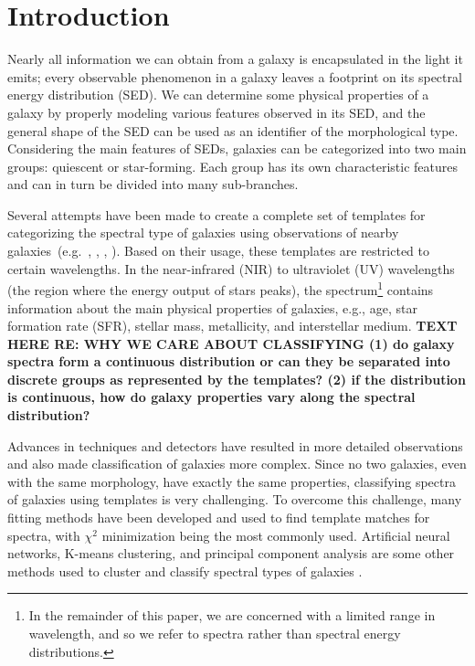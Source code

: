 \section{Introduction}
\label{sec: intro_somz}
Nearly all information we can obtain from a galaxy is encapsulated in the light it emits; every observable phenomenon in a galaxy leaves a footprint on its spectral energy distribution (SED).
We can determine some physical properties of a galaxy by properly modeling various features observed in its SED, and the general shape of the SED can be used as an identifier of the morphological type.
Considering the main features of SEDs, galaxies can be categorized into two main groups: quiescent or star-forming.
Each group has its own characteristic features and can in turn be divided into many sub-branches.

Several attempts have been made to create a complete set of templates for categorizing the spectral type of galaxies using observations of nearby galaxies~(e.g.~\citealt{Kinney93}, \citealt[][hereafter ]{Kinney96}, \citealt{Bershady00}, \citealt{Mannucci01}). 
Based on their usage, these templates are restricted to certain wavelengths.
In the near-infrared (NIR) to ultraviolet (UV) wavelengths (the region where the energy output of stars peaks), the spectrum\footnote{In the remainder of this paper, we are concerned with a limited range in wavelength, and so we refer to spectra rather than spectral energy distributions.} contains information about the main physical properties of galaxies, e.g., age, star formation rate (SFR), stellar mass, metallicity, and interstellar medium. 
\textbf{TEXT HERE RE: WHY WE CARE ABOUT CLASSIFYING
(1) do galaxy spectra form a continuous distribution or can they be separated into discrete groups as represented by the  templates? (2) if the distribution is continuous, how do galaxy properties vary along the spectral distribution?
}


Advances in techniques and detectors have resulted in more detailed observations and also made classification of galaxies more complex.
Since no two galaxies, even with the same morphology, have exactly the same properties, classifying spectra of galaxies using templates is very challenging.
To overcome this challenge, many fitting methods have been developed and used to find template matches for spectra, with $\chi^2$ minimization being the most commonly used. 
Artificial neural networks, K-means clustering, and principal component analysis are some other methods used to cluster and classify spectral types of galaxies \citep[e.g.][]{Allen13,Ordov14,Shi15}.

